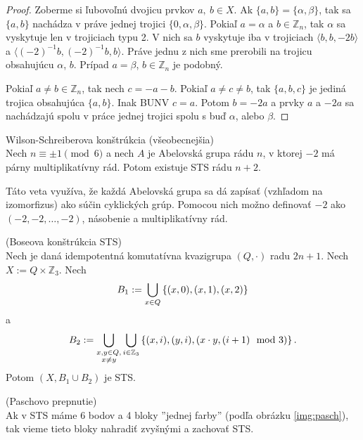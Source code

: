 \begin{proof}
	Zoberme si ľubovoľnú dvojicu prvkov $a,\ b \in X$. Ak $\{ a, b \} = \{ \alpha, \beta \}$, tak sa $\{a, b\}$ nachádza v práve jednej trojici $\{0, \alpha, \beta \}$. Pokiaľ $a = \alpha$ a $b \in \mathbb{Z}_n$, tak $\alpha$ sa vyskytuje len v trojiciach typu 2. V nich sa $b$ vyskytuje iba v trojiciach $\langle b, b, -2b \rangle$ a $\langle (-2)^{-1}b, (-2)^{-1}b, b \rangle$. Práve jednu z nich sme prerobili na trojicu obsahujúcu $\alpha$, $b$. Prípad $a = \beta$, $b \in \mathbb{Z}_n$ je podobný.
	
	Pokiaľ $a \ne b \in \mathbb{Z}_n$, tak nech $c = - a - b$. Pokiaľ $a \ne c \ne b$, tak $\{a, b, c\}$ je jediná trojica obsahujúca $\{a, b\}$. Inak BUNV $c = a$. Potom $b = -2a$ a prvky $a$ a $-2a$ sa nachádzajú spolu v práce jednej trojici spolu s buď $\alpha$, alebo $\beta$.
\end{proof}

\begin{theorem_hard}{Wilson-Schreiberova konštrúkcia (všeobecnejšia)}\\
	Nech $n \equiv \pm 1 \pmod{6}$ a nech $A$ je Abelovská grupa rádu $n$, v ktorej $-2$ má párny multiplikatívny rád. Potom existuje STS rádu $n + 2$. 
\end{theorem_hard}

Táto veta využíva, že každá Abelovská grupa sa dá zapísať (vzhľadom na izomorfizus) ako súčin cyklických grúp. Pomocou nich možno definovať $-2$ ako $(-2,-2, \dots, -2)$, násobenie a multiplikatívny rád.

\begin{theorem_hard}{(Boseova konštrúkcia STS)}\\
\label{th:bose}
Nech je daná idempotentná komutatívna kvazigrupa $(Q, \cdot)$ radu $2n + 1$.
Nech $X := Q \times \mathbb{Z}_3$.
Nech $$B_1 := \bigcup_{x \in Q} \left\{(x, 0), (x, 1), (x, 2)\right\}$$ a $$B_2 := \bigcup_{\substack{x, y \in Q,\\ x \neq y}}\bigcup_{i \in \mathbb{Z}_3} \left\{(x, i), (y, i), (x \cdot y, (i+1) \mod 3)\right\}.$$
Potom $(X, B_1 \cup B_2)$ je STS.
\end{theorem_hard}

\begin{theorem_hard}{(Paschovo prepnutie)}\\
\label{th:pasch}
Ak v STS máme 6 bodov a 4 bloky ''jednej farby'' (podľa obrázku \ref{img:pasch}), tak vieme tieto bloky nahradiť zvyšnými a zachovať STS.
\end{theorem_hard}


